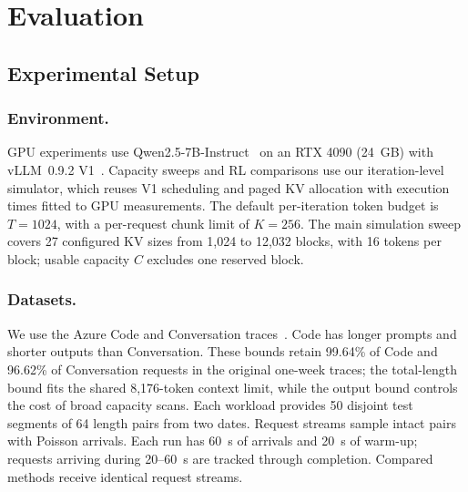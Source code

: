\documentclass[sigconf,anonymous,review]{acmart}
\begin{document}
\section{Evaluation}
\label{sec:evaluation}

\subsection{Experimental Setup}
\label{sec:setup}

\subsubsection{Environment.}
GPU experiments use Qwen2.5-7B-Instruct~\cite{spare_qwen} on an RTX 4090 (24~GB) with vLLM~0.9.2 V1~\cite{intro_vllm,vllmteam2025v1}.
Capacity sweeps and RL comparisons use our iteration-level simulator, which reuses V1 scheduling and paged KV allocation with execution times fitted to GPU measurements.
The default per-iteration token budget is $T=1024$, with a per-request chunk limit of $K=256$.
The main simulation sweep covers 27 configured KV sizes from 1,024 to 12,032 blocks, with 16 tokens per block; usable capacity $C$ excludes one reserved block.


\subsubsection{Datasets.}
We use the Azure Code and Conversation traces~\cite{spare_azure}.
Code has longer prompts and shorter outputs than Conversation. 
These bounds retain 99.64\% of Code and 96.62\% of Conversation requests in the original one-week traces; the total-length bound fits the shared 8,176-token context limit, while the output bound controls the cost of broad capacity scans.
Each workload provides 50 disjoint test segments of 64 length pairs from two dates.
Request streams sample intact pairs with Poisson arrivals.
Each run has 60~s of arrivals and 20~s of warm-up; requests arriving during 20--60~s are tracked through completion.
Compared methods receive identical request streams.
\end{document}
